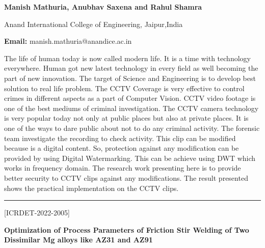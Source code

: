 \documentclass[twoside,11pt]{amsart}
\begin{document}
\centerline{\textbf{ Manish Mathuria, Anubhav Saxena and  Rahul Shamra  }}
\vskip 5mm
\begin{flushleft}
Anand International College of Engineering, Jaipur,India
\vskip 5mm
\end{flushleft}
\vskip 2mm
\begin{flushleft}
{\bf Email:} manish.mathuria@anandice.ac.in
\end{flushleft}
\vskip 5mm
\newpage
\vskip 2mm
The life of human today is now called modern life. It is a time with technology everywhere. Human got new latest technology in every field as well becoming the part of new innovation. The target of Science and Engineering is to develop best solution to real life problem. The CCTV Coverage is very effective to control crimes in different aspects as a part of Computer Vision. CCTV video footage is one of the best mediums of criminal investigation. The CCTV camera technology is very popular today not only at public places but also at private places. It is one of the ways to dare public about not to do any criminal activity. The forensic team investigate the recording to check activity. This clip can be modified because is a digital content. So, protection against any modification can be provided by using Digital Watermarking. This can be achieve using DWT which works in frequency domain. The research work presenting here is to provide better security to CCTV clips against any modifications. The result presented shows the practical implementation on the CCTV clips.
\vskip 2mm

\rule{\textwidth}{0.5pt}
\vskip 5mm
\begin{flushleft}
\centerline{[ICRDET-2022-2005]}
\end{flushleft}
\begin{center}\bf\LARGE
Optimization of Process Parameters of Friction Stir Welding of
Two Dissimilar Mg alloys like AZ31 and AZ91
\end{center}
\vskip 5mm
\end{document}
